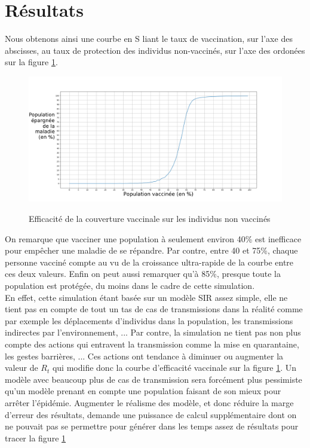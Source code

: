 \documentclass[journal, a4paper]{IEEEtran}
\begin{document}
\section{Résultats}
	Nous obtenons ainsi une courbe en S liant le taux de vaccination, sur l'axe des abscisses, au taux de protection des individus non-vaccinés, sur l'axe des ordonées sur la figure \ref{fig:results}.
	\begin{figure}[!hbt]
	\caption{Efficacité de la couverture vaccinale sur les individus non vaccinés}
		\includegraphics[width=\columnwidth]{Results}
		\label{fig:results}
	\end{figure}
 On remarque que vacciner une population à seulement environ 40\% est inefficace pour empêcher une maladie de se répandre. Par contre, entre 40 et 75\%, chaque personne vacciné compte au vu de la croissance ultra-rapide de la courbe entre ces deux valeurs. Enfin on peut aussi remarquer qu'à 85\%, presque toute la population est protégée, du moins dans le cadre de cette simulation. \\
	En effet, cette simulation étant basée sur un modèle SIR assez simple, elle ne tient pas en compte de tout un tas de cas de transmissions dans la réalité comme par exemple les déplacements d'individus dans la population, les transmissions indirectes par l'environnement, ...
	Par contre, la simulation ne tient pas non plus compte des actions qui entravent la transmission comme la mise en quarantaine, les gestes barrières, ...
	Ces actions ont tendance à diminuer ou augmenter la valeur de $R_t$ qui modifie donc la courbe d'efficacité vaccinale sur la figure \ref{fig:results}. Un modèle avec beaucoup plus de cas de transmission sera forcément plus pessimiste qu'un modèle prenant en compte une population faisant de son mieux pour arrêter l'épidémie. Augmenter le réalisme des modèle, et donc réduire la marge d'erreur des résultats, demande une puissance de calcul supplémentaire dont on ne pouvait pas se permettre pour générer dans les temps assez de résultats pour tracer la figure \ref{fig:results}
\end{document}
